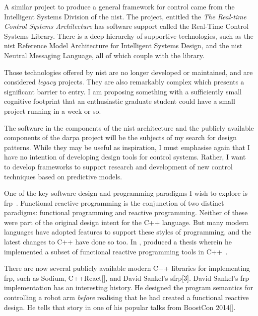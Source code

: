 A similar project to produce a general framework for control came from the
Intelligent Systems Division of the \ac{nist}. The project, entitled
the \emph{The Real-time Control Systems Architecture} has software support
called the Real-Time Control Systems Library. There is a deep hierarchy of
supportive technologies, such as the \ac{nist} Reference Model Architecture for
Intelligent Systems Design, and the \ac{nist} Neutral Messaging Language, all of
which couple with the library.

Those technologies offered by \ac{nist} are no longer developed or maintained,
and are considered \emph{legacy} projects. They are also remarkably complex
which presents a significant barrier to entry. I am proposing something with a
sufficiently small cognitive footprint that an enthusiastic graduate student
could have a small project running in a week or so.

The software in the components of the \ac{nist} architecture and the publicly
available components of the \ac{darpa} project will be the subjects of my search
for design patterns. While they may be useful as inspiration, I must emphasise
again that I have no intention of developing design tools for control systems.
Rather, I want to develop frameworks to support research and development of new
control techniques based on predictive models.

One of the key software design and programming paradigms I wish to explore is
\ac{frp}~\cite{Elliott1997,Hudak1999}. Functional reactive programming is the
conjunction of two distinct paradigms: functional programming and reactive
programming. Neither of these were part of the original design intent for the
C++ language. But many modern languages have adopted features to support these
styles of programming, and the latest changes to C++ have done so too. In
, \citeauthor{Al-Khanji2015} produced a thesis
wherein he implemented a subset of functional reactive programming tools in
C++~\cite{Al-Khanji2015}.

There are now several publicly available modern C++ libraries for implementing
\ac{frp}, such as Sodium,
C++React[\onelineskip], and
David Sankel's sfrp[3\onelineskip]. David
Sankel's \ac{frp} implementation has an interesting history. He designed the
program semantics for controlling a robot arm \emph{before} realising that he
had created a functional reactive design. He tells that story in one of his
popular talks from BoostCon
2014[\onelineskip].

